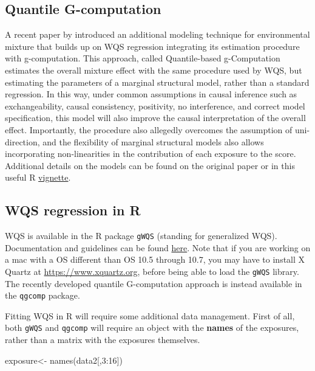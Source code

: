 \documentclass[
]{book}
\newenvironment{Shaded}{\begin{snugshade}}{\end{snugshade}}
\newcommand{\DecValTok}[1]{\textcolor[rgb]{0.00,0.00,0.81}{#1}}
\newcommand{\FunctionTok}[1]{\textcolor[rgb]{0.00,0.00,0.00}{#1}}
\newcommand{\NormalTok}[1]{#1}
\newcommand{\OtherTok}[1]{\textcolor[rgb]{0.56,0.35,0.01}{#1}}
\newcommand{\SpecialCharTok}[1]{\textcolor[rgb]{0.00,0.00,0.00}{#1}}
\begin{document}
\hypertarget{quantile-g-computation}{%
\subsection{Quantile G-computation}\label{quantile-g-computation}}

A recent paper by \citet{keil2020quantile} introduced an additional modeling technique for environmental mixture that builds up on WQS regression integrating its estimation procedure with g-computation. This approach, called Quantile-based g-Computation estimates the overall mixture effect with the same procedure used by WQS, but estimating the parameters of a marginal structural model, rather than a standard regression. In this way, under common assumptions in causal inference such as exchangeability, causal consistency, positivity, no interference, and correct model specification, this model will also improve the causal interpretation of the overall effect. Importantly, the procedure also allegedly overcomes the assumption of uni-direction, and the flexibility of marginal structural models also allows incorporating non-linearities in the contribution of each exposure to the score. Additional details on the models can be found on the original paper or in this useful R \href{https://cran.r-project.org/web/packages/qgcomp/vignettes/qgcomp-vignette.html}{vignette}.

\hypertarget{wqs-regression-in-r}{%
\subsection{WQS regression in R}\label{wqs-regression-in-r}}

WQS is available in the R package \texttt{gWQS} (standing for generalized WQS). Documentation and guidelines can be found \href{https://cran.r-project.org/web/packages/gWQS/gWQS.pdf}{here}. Note that if you are working on a mac with a OS different than OS 10.5 through 10.7, you may have to install X Quartz at \url{https://www.xquartz.org}, before being able to load the \texttt{gWQS} library. The recently developed quantile G-computation approach is instead available in the \texttt{qgcomp} package.

Fitting WQS in R will require some additional data management. First of all, both \texttt{gWQS} and \texttt{qgcomp} will require an object with the \textbf{names} of the exposures, rather than a matrix with the exposures themselves.

\begin{Shaded}
\begin{Highlighting}[]
\NormalTok{exposure}\OtherTok{\textless{}{-}} \FunctionTok{names}\NormalTok{(data2[,}\DecValTok{3}\SpecialCharTok{:}\DecValTok{16}\NormalTok{])}
\end{Highlighting}
\end{Shaded}
\end{document}
